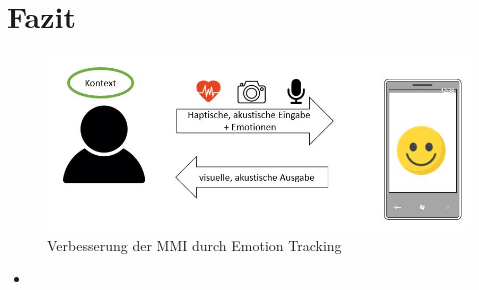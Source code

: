 \section{Fazit}
\begin{figure}[!ht]
	\centering
	\includegraphics[width=0.9\linewidth]{Pictures/Fazit_Grafik}
	\caption[Verbesserung der MMI durch Emotion Tracking]{Verbesserung der MMI durch Emotion Tracking}
	\label{fig:fazitgrafik}
\end{figure}

\begin{itemize}
	\item 
\end{itemize}
